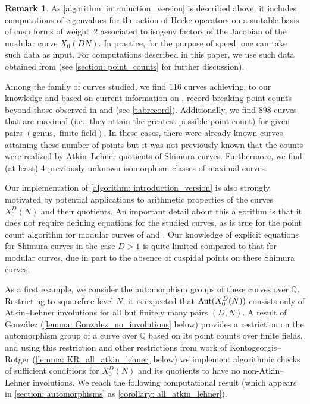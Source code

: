 \documentclass[11pt,reqno]{amsart}
\newcommand{\Q}{\mathbb{Q}}
\newcommand{\Aut}{{\rm Aut}}
\theoremstyle{definition}
\newtheorem{remark}[theorem]{Remark}
\newcommand{\Pietro}[1]{{\color{orange}{??Pietro: #1}}} %
\newcommand{\freddy}[1]{{\color{purple}{$\spadesuit$ Freddy: #1}}}
\begin{document}
\begin{remark}
As \cref{algorithm: introduction_version} is described above, it includes computations of eigenvalues for the action of Hecke operators on a suitable basis of cusp forms of weight~$2$ associated to isogeny factors of the Jacobian of the modular curve $X_0(DN)$. In practice, for the purpose of speed, one can take such data as input. For computations described in this paper, we use such data obtained from \cite{LMFDB} (see \cref{section: point_counts} for further discussion). 
\end{remark}

Among the family of curves studied, we find $116$ curves achieving, to our knowledge and based on current information on \cite{ManyPoints}, record-breaking point counts beyond those observed in \cite{DLMS} and \cite{DLMS26} (see \cref{tabrecord}). Additionally, we find $898$ curves that are maximal (i.e., they attain the greatest possible point count) %
for given pairs $(\text{genus}, \text{ finite field})$. In these cases, there were already known curves attaining these number of points but it was not previously known that the counts were realized by Atkin--Lehner quotients of Shimura curves. Furthermore, we find (at least) $4$ previously unknown isomorphism classes of maximal curves. %

Our implementation of \cref{algorithm: introduction_version} is also strongly motivated by potential applications to arithmetic properties of the curves $X_0^D(N)$ and their quotients. An important detail about this algorithm is that it does not require defining equations for the studied curves, as is true for the point count algorithm for modular curves of \cite{DLMS} and \cite{DLMS26}. Our knowledge of explicit equations for Shimura curves in the case $D>1$ is quite limited compared to that for modular curves, due in part to the absence of cuspidal points on these Shimura curves.

As a first example, we consider the automorphism groups of these curves over $\Q$. Restricting to squarefree level $N$, it is expected that $\Aut(X_0^D(N))$ consists only of Atkin--Lehner involutions for all but finitely many pairs $(D,N)$. A result of Gonz\'alez \cite{Gonzalez17} (\cref{lemma: Gonzalez_no_involutions} below) provides a restriction on the automorphism group of a curve over $\Q$ based on its point counts over finite fields, and using this restriction and other restrictions from work of Kontogeorgis--Rotger \cite{KR08} (\cref{lemma: KR_all_atkin_lehner} below) we implement algorithmic checks of sufficient conditions for $X_0^D(N)$ and its quotients to have no non-Atkin--Lehner involutions. We reach the following computational result (which appears in \cref{section: automorphisms} as \cref{corollary: all_atkin_lehner}). 
\end{document}
